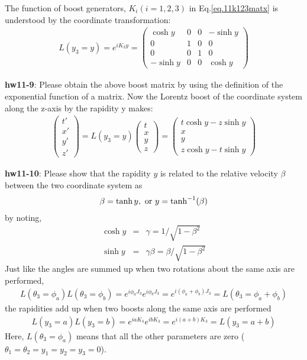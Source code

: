 \documentclass[12pt]{article}
\begin{document}
  The function of boost generators, $K_i (i=1,2,3)$ in Eq.\ref{eq.11k123matx} is understood by the coordinate transformation:
\begin{eqnarray}
  L(y_3 = y)
  = e^{ i K_3 y }=
  \begin{pmatrix}
    \cosh y & 0 & 0 & -\sinh y \\
    0 & 1 & 0 & 0 \\
    0 & 0 & 1 & 0 \\
    -\sinh y & 0 & 0 & \cosh y
  \end{pmatrix}
\end{eqnarray}

{\bf hw11-9}: Please obtain the above boost matrix by using the definition
  of the exponential function of a matrix.
  Now the Lorentz boost of the coordinate system along the z-axis by
  the rapidity y makes:
\begin{eqnarray}
  \begin{pmatrix}
    t' \\ x' \\ y' \\ z'
  \end{pmatrix}
  = L(y_3=y)
  \begin{pmatrix}
    t \\ x \\ y \\ z
  \end{pmatrix}
  =
  \begin{pmatrix}
    t\cosh y -z\sinh y \\ x \\ y \\ z\cosh y -t\sinh y
  \end{pmatrix}
\end{eqnarray}

{\bf hw11-10}:
  Please show that the rapidity $y$ is related to the relative velocity
  $\beta$ between the two coordinate system as
\begin{eqnarray}
  \beta = \tanh y , ~{\rm or}~ y = \tanh^{-1}(\beta)
\end{eqnarray}
  by noting,
\begin{eqnarray}
  \cosh y &=& \gamma      =     1/\sqrt{1-\beta^2} \\
  \sinh y &=& \gamma\beta = \beta/\sqrt{1-\beta^2}
\end{eqnarray}
  Just like the angles are summed up when two rotations about the same
  axis are performed,
\begin{eqnarray}
  L(\theta_3=\phi_a) L(\theta_3=\phi_b)
   = e^{ i\phi_a J_3 } e^{ i\phi_b J_3 }
   = e^{ i(\phi_a+\phi_b) J_3 }
   = L(\theta_3 = \phi_a + \phi_b ) \label{eq.11rotatphia}
\end{eqnarray}
  the rapidities add up when two boosts along the same axis are performed
\begin{eqnarray}
  L(y_3 = a) L(y_3 = b)
  = e^{ i a K_3 } e^{ i b K_3 }
  = e^{ i (a+b) K_3 }
  = L(y_3 = a+b ) \label{eq.11boosta}
\end{eqnarray}
  Here, $L(\theta _3=\phi_a)$ means that all the other parameters are zero
  ($\theta_1=\theta_2=y_1=y_2=y_3=0$).
\end{document}

